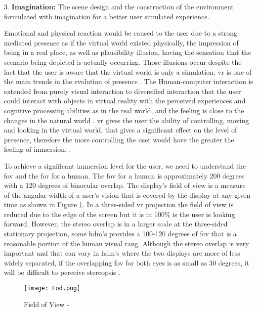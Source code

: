 3. \textbf{Imagination:} The scene design and the construction of
the environment formulated with imagination for a
better user simulated experience.


Emotional and physical reaction would be caused to the user due to a strong mediated presence as if the virtual world existed physically, the impression of being in a real place, as well as plausibility illusion, having the sensation that the scenario being depicted is actually occurring. Those illusions occur despite the fact that the user is aware that the virtual world is only a simulation. \acrshort{vr} is one of the main trends in the evolution of presence \citep{Waterworth2014, Steinicke2016}.
The Human-computer interaction is extended from purely visual interaction to diversified interaction that the user could interact with objects in virtual reality with the perceived experiences and cognitive processing abilities as in the real world, and the feeling is close to the changes in the natural world \citep{Hu2016}.
\acrshort{vr} gives the user the ability of controlling, moving and looking in the virtual world, that gives a significant effect on the level of presence, therefore the more controlling the user would have the greater the feeling of immersion\citep{William}. \cite[p.4]{Waterworth2014}.


To achieve a significant immersion level for the user, we need to understand the \acrfull{fov} and the \acrfull{for} for a human. The \acrshort{fov} for a human is approximately 200 degrees with a 120 degrees of binocular overlap. The display's field of view is a measure of the angular width of a user's vision that is covered by the display at any given time as shown in Figure \ref{fig:field}. In a three-sided \acrshort{vr} projection the field of view is reduced due to the edge of the screen but it is in 100\% is the user is looking forward. However, the stereo overlap is in a larger scale at the three-sided stationary projection, some \acrfull{hdm}'s provides a 100-120 degrees of \acrshort{fov} that is a reasonable portion of the human visual rang. Although the stereo overlap is very important and that can vary in \acrshort{hdm}'s where the two displays are more of less widely separated, if the overlapping  
\acrshort{fov} for both eyes is as small as 30 degrees, it will be difficult to perceive stereopsis \citep{William}. 

\begin{figure}[h]
    \centering
    \texttt{[image: Fod.png]}
    \caption{Field of View - \citep{William}}
    \label{fig:field}
\end{figure}


